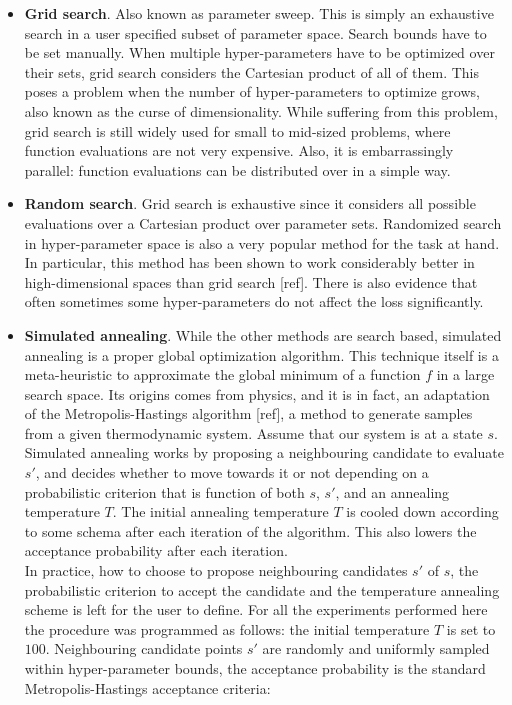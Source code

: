 \documentclass[10pt,a4paper,twoside]{book}
\begin{document}
\begin{itemize}
	\item \textbf{Grid search}. Also known as parameter sweep. This is simply an exhaustive search in a user specified subset of parameter space. Search bounds have to be set manually. When multiple hyper-parameters have to be optimized over their sets, grid search considers the Cartesian product of all of them. This poses a problem when the number of hyper-parameters to optimize grows, also known as the curse of dimensionality. While suffering from this problem, grid search is still widely used for small to mid-sized problems, where function evaluations are not very expensive. Also, it is embarrassingly parallel: function evaluations can be distributed over in a simple way.
	\item \textbf{Random search}. Grid search is exhaustive since it considers all possible evaluations over a Cartesian product over parameter sets. Randomized search in hyper-parameter space is also a very popular method for the task at hand. In particular, this method has been shown to work considerably better in high-dimensional spaces than grid search [ref]. There is also evidence that often sometimes some hyper-parameters do not affect the loss significantly.
	\item \textbf{Simulated annealing}. While the other methods are search based, simulated annealing is a proper global optimization algorithm. This technique itself is a meta-heuristic to approximate the global minimum of a function $f$ in a large search space. Its origins comes from physics, and it is in fact, an adaptation of the Metropolis-Hastings algorithm [ref], a method to generate samples from a given thermodynamic system. Assume that our system is at a state $s$. Simulated annealing works by proposing a neighbouring candidate to evaluate $s'$, and decides whether to move towards it or not depending on a probabilistic criterion that is function of both $s$, $s'$, and an annealing temperature $T$. The initial annealing temperature $T$ is cooled down according to some schema after each iteration of the algorithm. This also lowers the acceptance probability after each iteration.\\
	
	In practice, how to choose to propose neighbouring candidates $s'$ of $s$, the probabilistic criterion to accept the candidate and the temperature annealing scheme is left for the user to define. For all the experiments performed here the procedure was programmed as follows: the initial temperature $T$ is set to $100$. Neighbouring candidate points $s'$ are randomly and uniformly sampled within hyper-parameter bounds, the acceptance probability is the standard Metropolis-Hastings acceptance criteria:
	

\end{itemize}
\end{document}
